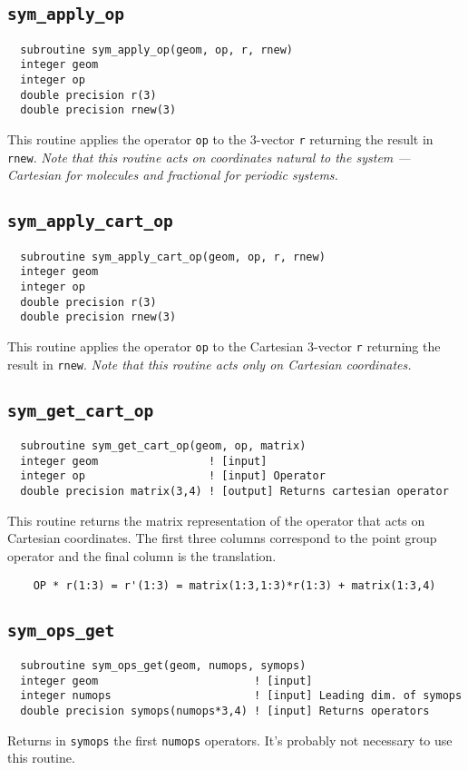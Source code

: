 \subsection{{\tt sym\_apply\_op}}
\begin{verbatim}
  subroutine sym_apply_op(geom, op, r, rnew)
  integer geom
  integer op
  double precision r(3)
  double precision rnew(3)
\end{verbatim}
This routine  applies the operator \verb+op+ to the 3-vector \verb+r+ returning the
result in \verb+rnew+.  {\em Note that this routine acts on
  coordinates natural to the system --- Cartesian for molecules and
  fractional for periodic systems.}

\subsection{{\tt sym\_apply\_cart\_op}}
\begin{verbatim}
  subroutine sym_apply_cart_op(geom, op, r, rnew)
  integer geom
  integer op
  double precision r(3)
  double precision rnew(3)
\end{verbatim}
This routine  applies the operator \verb+op+ to the Cartesian 3-vector \verb+r+
returning the result in \verb+rnew+.  {\em Note that this routine acts
  only on Cartesian coordinates.}

\subsection{{\tt sym\_get\_cart\_op}}
\begin{verbatim}
  subroutine sym_get_cart_op(geom, op, matrix)
  integer geom                 ! [input]
  integer op                   ! [input] Operator
  double precision matrix(3,4) ! [output] Returns cartesian operator
\end{verbatim}
This routine  returns the matrix representation of the operator that acts on
Cartesian coordinates.  The first three columns correspond to the
point group operator and the final column is the translation.

\begin{verbatim}
    OP * r(1:3) = r'(1:3) = matrix(1:3,1:3)*r(1:3) + matrix(1:3,4)
\end{verbatim}

\subsection{{\tt sym\_ops\_get}}
\begin{verbatim}
  subroutine sym_ops_get(geom, numops, symops)
  integer geom                        ! [input]
  integer numops                      ! [input] Leading dim. of symops
  double precision symops(numops*3,4) ! [input] Returns operators
\end{verbatim}
Returns in \verb+symops+ the first \verb+numops+ operators.  It's 
probably not necessary to use this routine.

